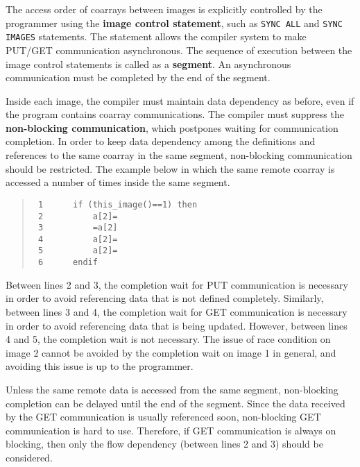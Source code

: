 The access order of coarrays between images is explicitly controlled by the 
programmer using the {\bf image control statement}, 
such as {\tt SYNC ALL} and {\tt SYNC IMAGES} statements. 
The statement allows the compiler system to make PUT/GET communication asynchronous.
The sequence of execution between the image control statements is called as a {\bf segment}.
An asynchronous communication must be completed by the end of the segment.

Inside each image, the compiler must maintain data dependency 
as before, even if the program contains coarray communications.
The compiler must suppress the {\bf non-blocking communication},
which postpones waiting for communication completion.
In order to keep data dependency among the definitions and references to the same 
coarray in the same segment, non-blocking communication should be restricted.
The example below in which the same remote coarray is accessed a number of times 
inside the same segment.
\begin{quote}
\begin{verbatim}
 1      if (this_image()==1) then
 2          a[2]=
 3          =a[2]
 4          a[2]=
 5          a[2]=
 6      endif
\end{verbatim}
\end{quote}
Between lines 2 and 3, the completion wait for PUT communication is necessary in order
to avoid referencing data that is not defined completely.
Similarly, between lines 3 and 4, the completion wait for GET communication is 
necessary in order to avoid referencing data that is being updated.
However, between lines 4 and 5, the completion wait is not necessary.
The issue of race condition on image 2 cannot be avoided by the completion wait
on image 1 in general, and avoiding this issue is up to the programmer.

\requirement
Unless the same remote data is accessed from the same segment, 
non-blocking completion can be delayed until the end of the segment.
Since the data received by the GET communication is usually referenced soon, 
non-blocking GET communication is hard to use. Therefore, if GET communication is
always on blocking, then only the flow dependency (between lines 2 and 3) should be considered.


